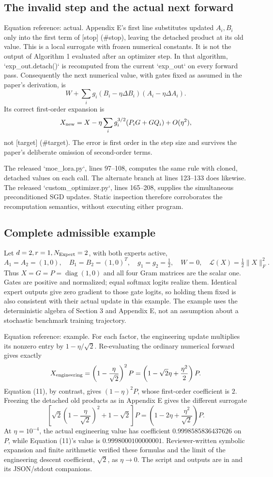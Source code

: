 \documentclass[10pt]{article}
\begin{document}
\subsection*{The invalid step and the actual next forward}
Equation reference: actual. Appendix E’s first line substitutes updated \(A_i,B_i\) only into the first term of [stop] (\#stop), leaving the detached product at its old value. This is a local surrogate with frozen numerical constants. It is not the output of Algorithm 1 evaluated after an optimizer step. In that algorithm, `exp\_out.detach()` is recomputed from the current `exp\_out` on every forward pass. Consequently the next numerical value, with gates fixed as assumed in the paper’s derivation, is \[W+\sum_i g_i(B_i-\eta\Delta B_i)(A_i-\eta\Delta A_i).\] Its correct first-order expansion is \[
 X_{\rm new}=X-\eta\sum_i g_i^{3/2}(P_iG+GQ_i)+O(\eta^2),\] not [target] (\#target). The error is first order in the step size and survives the paper’s deliberate omission of second-order terms.\par
The released `moe\_lora.py`, lines 97–108, computes the same rule with cloned, detached values on each call. The alternate branch at lines 123–133 does likewise. The released `custom\_optimizer.py`, lines 165–208, supplies the simultaneous preconditioned SGD updates. Static inspection therefore corroborates the recomputation semantics, without executing either program.\par
\subsection*{Complete admissible example}
Let \(d=2,r=1,N_{\rm Expert}=2\), with both experts active, \[A_1=A_2=(1,0),\quad B_1=B_2=(1,0)^T,\quad
 g_1=g_2=\tfrac12,\quad W=0,\quad
 \mathcal L(X)=\tfrac12\|X\|_F^2.\] Thus \(X=G=P=\operatorname{diag}(1,0)\) and all four Gram matrices are the scalar one. Gates are positive and normalized; equal softmax logits realize them. Identical expert outputs give zero gradient to those gate logits, so holding them fixed is also consistent with their actual update in this example. The example uses the deterministic algebra of Section 3 and Appendix E, not an assumption about a stochastic benchmark training trajectory.\par
Equation reference: example. For each factor, the engineering update multiplies its nonzero entry by \(1-\eta/\sqrt2\). Re-evaluating the ordinary numerical forward gives exactly \[
 X_{\rm engineering}
   =\left(1-\frac{\eta}{\sqrt2}\right)^2P
   =\left(1-\sqrt2\eta+\frac{\eta^2}{2}\right)P.\] Equation (11), by contrast, gives \((1-\eta)^2P\), whose first-order coefficient is \(2\). Freezing the detached old products as in Appendix E gives the different surrogate \[\left[\sqrt2\left(1-\frac{\eta}{\sqrt2}\right)^2+1-\sqrt2\right]P
 =\left(1-2\eta+\frac{\eta^2}{\sqrt2}\right)P.\] At \(\eta=10^{-4}\), the actual engineering value has coefficient \(0.9998585836437626\) on \(P\), while Equation (11)’s value is \(0.9998000100000001\). Reviewer-written symbolic expansion and finite arithmetic verified these formulas and the limit of the engineering descent coefficient, \(\sqrt2\), as \(\eta\to0\). The script and outputs are in and its JSON/stdout companions.\par
\end{document}
